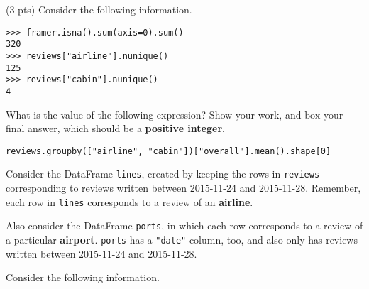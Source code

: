 \documentclass[twoside,12pt]{article}
\begin{document}
\begin{probset}
\begin{prob}[(8 pts)]
\begin{subprobset}
\begin{subprob}




\end{subprob}

\begin{subprob}(3 pts) Consider the following information.

\begin{verbatim}
>>> framer.isna().sum(axis=0).sum()
320
>>> reviews["airline"].nunique()
125
>>> reviews["cabin"].nunique()
4
\end{verbatim} 

What is the value of the following expression? Show your work, and $\boxed{\text{box}}$ your final answer, which should be a \textbf{positive integer}.

\begin{verbatim}
reviews.groupby(["airline", "cabin"])["overall"].mean().shape[0]
\end{verbatim}

\biginlineresponsebox[6in]{}

\end{subprob}
    
\end{subprobset}
    
\end{prob}

\newpage

\begin{prob}[(10 pts)]

Consider the DataFrame \texttt{lines}, created by keeping the rows in \texttt{reviews} corresponding to reviews written between 2015-11-24 and 2015-11-28. Remember, each row in \texttt{lines} corresponds to a review of an \textbf{airline}.

Also consider the DataFrame \texttt{ports}, in which each row corresponds to a review of a particular \textbf{airport}. \texttt{ports} has a \texttt{"date"} column, too, and also only has reviews written between 2015-11-24 and 2015-11-28.

Consider the following information.

\vspace{0.1in}


\end{prob}
\end{probset}
\end{document}
